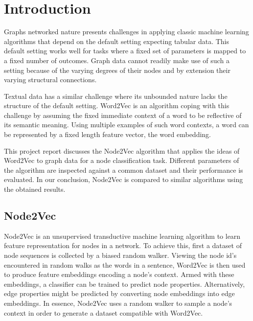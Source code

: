 \documentclass[a4paper,10pt]{article}
\begin{document}



\tableofcontents
\newpage

\section{Introduction}

Graphs networked nature presents challenges in applying classic machine learning algorithms that depend on the default setting expecting tabular data. This default setting works well for tasks where a fixed set of parameters is mapped to a fixed number of outcomes. Graph data cannot readily make use of such a setting because of the varying degrees of their nodes and by extension their varying structural connections.

Textual data has a similar challenge where its unbounded nature lacks the structure of the default setting. Word2Vec is an algorithm coping with this challenge by assuming the fixed immediate context of a word to be reflective of its semantic meaning. Using multiple examples of such word contexts, a word can be represented by a fixed length feature vector, the word embedding.

This project report discusses the Node2Vec algorithm that applies the ideas of Word2Vec to graph data for a node classification task. Different parameters of the algorithm are inspected against a common dataset and their performance is evaluated. In our conclusion, Node2Vec is compared to similar algorithms using the obtained results.

\subsection{Node2Vec}

Node2Vec is an unsupervised transductive machine learning algorithm to learn feature representation for nodes in a network. To achieve this, first a dataset of node sequences is collected by a biased random walker. Viewing the node id’s encountered in random walks as the words in a sentence, Word2Vec is then used to produce feature embeddings encoding a node’s context. Armed with these embeddings, a classifier can be trained to predict node properties. Alternatively, edge properties might be predicted by converting node embeddings into edge embeddings. In essence, Node2Vec uses a random walker to sample a node's context in order to generate a dataset compatible with Word2Vec.
\end{document}
